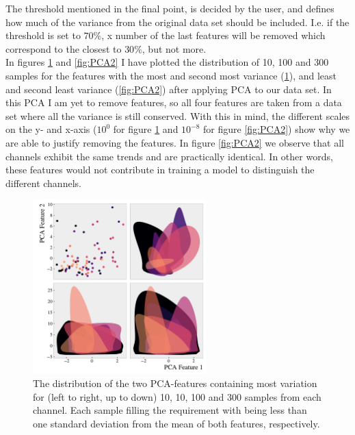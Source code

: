 The threshold mentioned in the final point, is decided by the user, and defines how much of the variance from the original data 
set should be included. I.e. if the threshold is set to $70\%$, x number of the last features will be removed which correspond to 
the closest to $30\%$, but not more.
\\
In figures \ref{fig:PCA1} and \ref{fig:PCA2} I have plotted the distribution of 10, 100 and 300 samples 
for the features with the most and second most variance (\ref{fig:PCA1}), and least and second least 
variance (\ref{fig:PCA2}) after applying \ac{PCA} to our data set. In this \ac{PCA} I am yet to remove features, 
so all four features are taken from a data set where all the variance is still conserved. With this in 
mind, the different scales on the y- and x-axis ($10^0$ for figure \ref{fig:PCA1} and $10^{-8}$ for figure 
\ref{fig:PCA2}) show why we are able to justify removing the features. In figure \ref{fig:PCA2} we observe 
that all channels exhibit the same trends and are practically identical. In other words, these features 
would not contribute in training a model to distinguish the different channels.
\begin{figure}
    \centering
    \includegraphics[width=0.6\textwidth]{Figures/MLResults/DataHandling/PCA/PCAPlotFirst.pdf}
    \caption{The distribution of the two PCA-features containing most variation for (left to right, 
    up to down) 10, 10, 100 and 300 samples from each channel. Each sample filling the requirement 
    with being less than one standard deviation from the mean of both features, respectively.}
    \label{fig:PCA1}
\end{figure}
